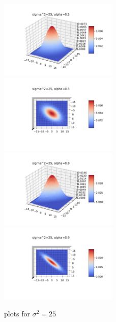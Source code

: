 \documentclass[english]{exercisesheet}
\begin{document}
\begin{solution}
\begin{figure}
 \includegraphics[width=0.5\textwidth]{images/plot-5-5-side.pdf} \includegraphics[width=0.5\textwidth]{images/plot-5-5-top.pdf}\\
 \includegraphics[width=0.5\textwidth]{images/plot-5-9-side.pdf} \includegraphics[width=0.5\textwidth]{images/plot-5-9-top.pdf}
 \caption{plots for $\sigma^2=25$}
\end{figure}
\begin{figure}

\end{figure}
\end{solution}
\end{document}

